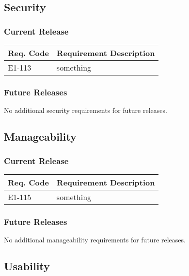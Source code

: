 \documentclass[12pt]{article}
\begin{document}
\subsection{Security}

\subsubsection{Current Release}

\begin{table}[!h]
	\begin{tabular}{| l | l |}
		\hline
		\textbf{Req. Code} & \textbf{Requirement Description}\\
		\hline
		E1-113	& something\\
		\hline
	\end{tabular}
	\label{tab:SecurityRequirements}
\end{table}

\subsubsection{Future Releases}
No additional security requirements for future releases.


\subsection{Manageability}

\subsubsection{Current Release}

\begin{table}[!h]
	\begin{tabular}{| l | l |}
		\hline
		\textbf{Req. Code} & \textbf{Requirement Description}\\
		\hline
		E1-115	& something\\
		\hline
	\end{tabular}
	\label{tab:ManageabilityRequirements}
\end{table}

\subsubsection{Future Releases}
No additional manageability requirements for future releases.


\subsection{Usability}
\end{document}
